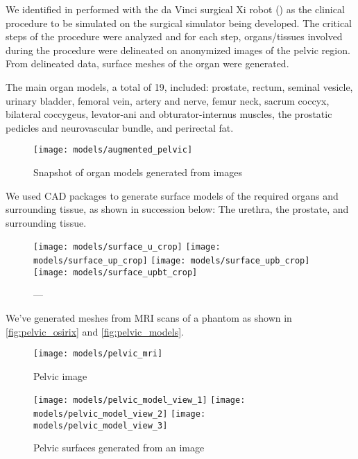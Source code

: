 We identified  in  performed with the da Vinci surgical Xi robot () as the clinical procedure to be simulated on the surgical simulator being developed. The critical steps of the  procedure were analyzed and for each step, organs/tissues involved during the procedure were delineated on anonymized  images of the pelvic region. From delineated data,  surface meshes of the organ were generated.

The main organ models, a total of 19, included: prostate, rectum, seminal vesicle, urinary bladder, femoral vein, artery and nerve, femur neck, sacrum coccyx, bilateral coccygeus, levator-ani and obturator-internus muscles, the prostatic pedicles and neurovascular bundle, and perirectal fat.

\begin{figure}
  \centering%
  \texttt{[image: models/augmented\_pelvic]}
  \caption{Snapshot of organ models generated from  images}\label{fig:organ_generation}
\end{figure}

We used CAD packages to generate surface models of the required organs and surrounding tissue, as shown in succession below: The urethra, the prostate, and surrounding tissue.

\begin{figure}
  \centering%
  \texttt{[image: models/surface\_u\_crop]}\hfill%
  \texttt{[image: models/surface\_up\_crop]}\hfill%
  \texttt{[image: models/surface\_upb\_crop]}\hfill%
  \texttt{[image: models/surface\_upbt\_crop]}
  \caption{---}\label{fig:surface_meshes}
\end{figure}

We've generated meshes from MRI scans of a phantom as shown in \autoref{fig:pelvic_osirix} and \autoref{fig:pelvic_models}.

\begin{figure}
  \centering%
	\texttt{[image: models/pelvic\_mri]}\\[10ex]
	\caption{Pelvic  image}\label{fig:pelvic_osirix}
\end{figure}
\begin{figure}
  \centering%
	\texttt{[image: models/pelvic\_model\_view\_1]}\hfill%
	\texttt{[image: models/pelvic\_model\_view\_2]}\hfill%
	\texttt{[image: models/pelvic\_model\_view\_3]}
	\caption{Pelvic surfaces generated from an  image}\label{fig:pelvic_models}
\end{figure}

